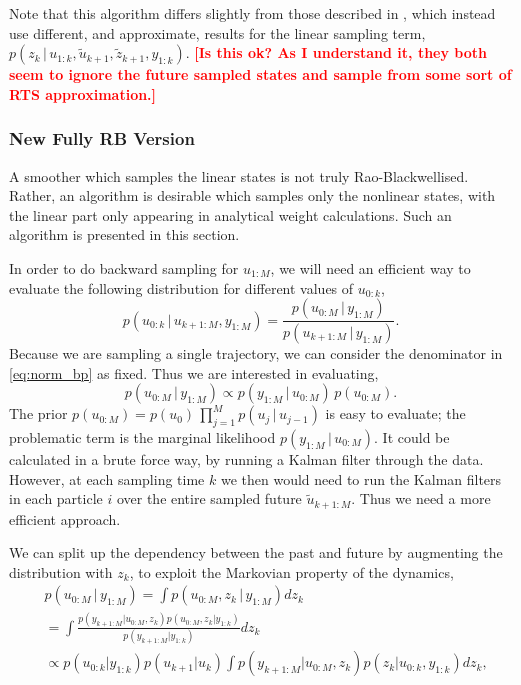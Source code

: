 \documentclass[twocolumn]{autart}    %
\newcommand{\comment}[1]{\textcolor{red}{\textbf{[#1]}}}
\begin{document}
Note that this algorithm differs slightly from those described in \cite{Fong+Godsill+Doucet+West:2002,Lindsten+Schon:2011}, which instead use different, and approximate, results for the linear sampling term, $p(z_k\,|\, u_{1:k}, \tilde{u}_{k+1}, \tilde{z}_{k+1},y_{1:k})$. \comment{Is this ok? As I understand it, they both seem to ignore the future sampled states and sample from some sort of RTS approximation.}



\subsubsection{New Fully RB Version}

A smoother which samples the linear states is not truly Rao-Blackwellised. Rather, an algorithm is desirable which samples only the nonlinear states, with the linear part only appearing in analytical weight calculations. Such an algorithm is presented in this section.

In order to do backward sampling for $u_{1:M}$, we will need an efficient way to evaluate the following distribution for different values of $u_{0:k}$,
%
\begin{equation}
  p(u_{0:k}\,|\,u_{k+1:M},y_{1:M})
  = \frac{p(u_{0:M}\,|\,y_{1:M})}{p(u_{k+1:M}\,|\,y_{1:M})}.
\label{eq:norm_bp}
\end{equation}
%
Because we are sampling a single trajectory, we can consider the denominator in \eqref{eq:norm_bp} as fixed. Thus we are interested in
evaluating,
%
\begin{equation}
  p(u_{0:M}\,|\,y_{1:M}) \propto p(y_{1:M}\,|\,u_{0:M}) \, p(u_{0:M}).
\end{equation}
%
The prior $p(u_{0:M}) = p(u_0) \, \prod_{j=1}^M p(u_{j}\,|\,u_{j-1})$ is easy to evaluate; the problematic term is the marginal likelihood $p(y_{1:M}\,|\,u_{0:M})$. It could be calculated in a brute force way, by running a Kalman filter through the data.  However, at each sampling time $k$ we then would need to run the Kalman filters in each particle $i$ over the entire sampled future $\tilde{u}_{k+1:M}$. Thus we need a more efficient approach.

We can split up the dependency between the past and future by augmenting the distribution with $z_k$, to exploit the Markovian property of the dynamics,
%
\begin{equation}
\begin{split}
  & p(u_{0:M}\,|\,y_{1:M}) = \int p(u_{0:M}, z_k \,|\,y_{1:M}) dz_k \\
  &= \int \frac{ p(y_{k+1:M} | u_{0:M}, z_k) p(u_{0:M}, z_k | y_{1:k}) }{ p(y_{k+1:M} | y_{1:k}) } dz_k \\
  &\propto p(u_{0:k} | y_{1:k}) p(u_{k+1} | u_{k}) \int p(y_{k+1:M} | u_{0:M}, z_k) p(z_k | u_{0:k}, y_{1:k}) dz_k    ,
\end{split}
\label{eq:split}
\end{equation}
\end{document}

